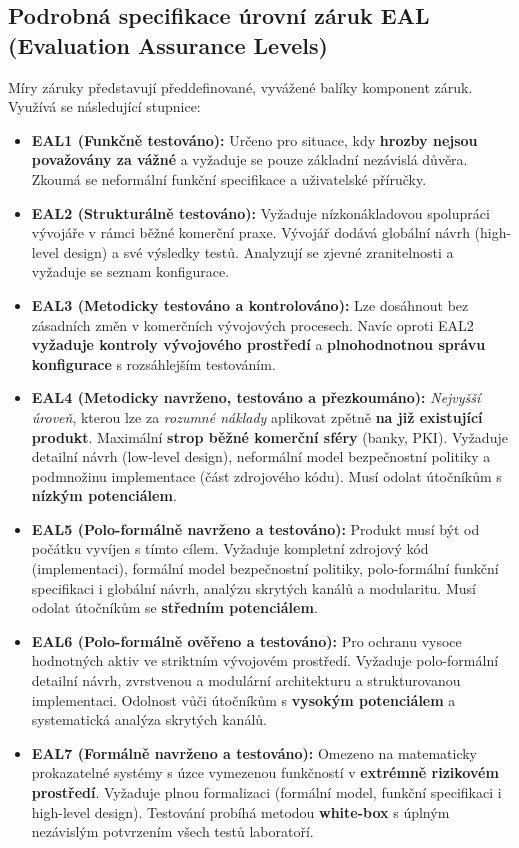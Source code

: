\documentclass[10pt,a4paper]{article}
\begin{document}
	\subsection{Podrobná specifikace úrovní záruk EAL (Evaluation Assurance Levels)}
	Míry záruky představují předdefinované, vyvážené balíky komponent záruk. Využívá se následující stupnice:
	\begin{itemize}
		\item \textbf{EAL1 (Funkčně testováno):} Určeno pro situace, kdy \textbf{hrozby nejsou považovány za vážné} a vyžaduje se pouze základní nezávislá důvěra. Zkoumá se neformální funkční specifikace a uživatelské příručky.
		
		\item \textbf{EAL2 (Strukturálně testováno):} Vyžaduje nízkonákladovou spolupráci vývojáře v rámci běžné komerční praxe. Vývojář dodává globální návrh (high-level design) a své výsledky testů. Analyzují se zjevné zranitelnosti a vyžaduje se seznam konfigurace.
		
		\item \textbf{EAL3 (Metodicky testováno a kontrolováno):} Lze dosáhnout bez zásadních změn v komerčních vývojových procesech. Navíc oproti EAL2 \textbf{vyžaduje kontroly vývojového prostředí} a \textbf{plnohodnotnou správu konfigurace} s rozsáhlejším testováním.
		
		\item \textbf{EAL4 (Metodicky navrženo, testováno a přezkoumáno):} \textit{Nejvyšší úroveň}, kterou lze za \textit{rozumné náklady} aplikovat zpětně \textbf{na již existující produkt}. 
		Maximální \textbf{strop běžné komerční sféry} (banky, PKI). 
		Vyžaduje detailní návrh (low-level design), neformální model bezpečnostní politiky a podmnožinu implementace (část zdrojového kódu). 
		Musí odolat útočníkům s \textbf{nízkým potenciálem}.
		
		\item \textbf{EAL5 (Polo-formálně navrženo a testováno):} Produkt musí být od počátku vyvíjen s tímto cílem. 
		Vyžaduje kompletní zdrojový kód (implementaci), formální model bezpečnostní politiky, polo-formální funkční specifikaci i globální návrh, analýzu skrytých kanálů a modularitu. 
		Musí odolat útočníkům se \textbf{středním potenciálem}.
		
		\item \textbf{EAL6 (Polo-formálně ověřeno a testováno):} Pro ochranu vysoce hodnotných aktiv ve striktním vývojovém prostředí. Vyžaduje polo-formální detailní návrh, zvrstvenou a modulární architekturu a strukturovanou implementaci. 
		Odolnost vůči útočníkům s \textbf{vysokým potenciálem} a systematická analýza skrytých kanálů.
		
		\item \textbf{EAL7 (Formálně navrženo a testováno):} Omezeno na matematicky prokazatelné systémy s úzce vymezenou funkčností v \textbf{extrémně rizikovém prostředí}. 
		Vyžaduje plnou formalizaci (formální model, funkční specifikaci i high-level design). 
		Testování probíhá metodou \textbf{white-box} s úplným nezávislým potvrzením všech testů laboratoří.
	\end{itemize}
	
\end{document}
